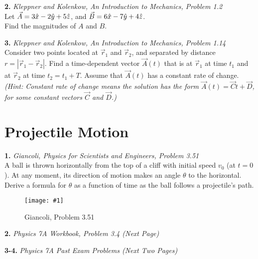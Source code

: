 \documentclass[11pt]{article}
\newcommand{\fig}[4]{
    \begin{figure}[H]
        \centering
        \texttt{[image: \#1]}
        \caption{#2}
        \label{exp4fit}
    \end{figure}
}
\theoremstyle{gangnamstyle}{\newtheorem{definition}{Definition}[]}
\theoremstyle{gangnamstyle}{\newtheorem{example}{Example}[]}
\theoremstyle{gangnamstyle}{\newtheorem{problem}{Problem}[]}
\begin{document}
\textbf{2.} \textit{Kleppner and Kolenkow, An Introduction to Mechanics, Problem 1.2} \\
Let $\Vec{A} = 3\Hat{x} - 2\Hat{y} + 5\Hat{z}$, and $\Vec{B} = 6\Hat{x} - 7\Hat{y} + 4\Hat{z}$. \\
Find the magnitudes of $A$ and $B$. 
\vspace{1 in}

\textbf{3.} \textit{Kleppner and Kolenkow, An Introduction to Mechanics, Problem 1.14} \\
Consider two points located at $\Vec{r}_1$ and $\Vec{r}_2$, and separated by distance $r = |\Vec{r}_1 - \Vec{r}_2|$. Find a time-dependent vector $\Vec{A}(t)$ that is at $\Vec{r}_1$ at time $t_1$ and at $\Vec{r}_2$ at time $t_2 = t_1 + T$. Assume that $\Vec{A}(t)$ has a constant rate of change. \\
\textit{(Hint: Constant rate of change means the solution has the form $\Vec{A}(t) = \Vec{C}t + \Vec{D}$, for some constant vectors $\Vec{C}$ and $\Vec{D}$.)}
\vspace{1 in}



\section{Projectile Motion}

\textbf{1.} \textit{Giancoli, Physics for Scientists and Engineers, Problem 3.51} \\
A ball is thrown horizontally from the top of a cliff with initial speed $v_0$ (at $t = 0$). At any moment, its direction of motion makes an angle $\theta$ to the horizontal. Derive a formula for $\theta$ as a function of time as the ball follows a projectile’s path. 
\fig{figs/0620/proj.png}{Giancoli, Problem 3.51}{0.75}{0}
\vspace{1 in}

\textbf{2.} \textit{Physics 7A Workbook, Problem 3.4 (Next Page)} 
\vspace{1 in}

\textbf{3-4.} \textit{Physics 7A Past Exam Problems (Next Two Pages)} 
\vspace{1 in}




\end{document}
